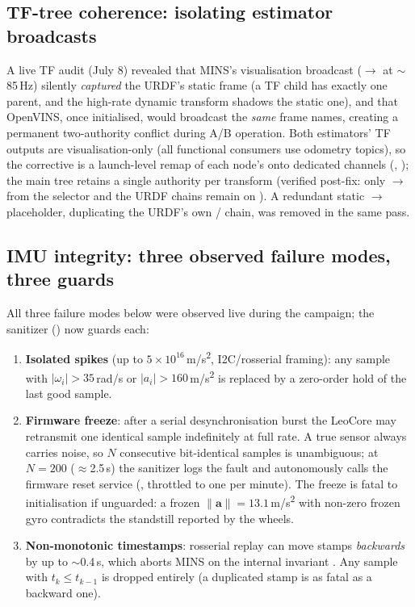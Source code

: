 \subsection{TF-tree coherence: isolating estimator broadcasts}
A live TF audit (July 8) revealed that MINS's visualisation broadcast
($\to$ at $\sim$85\,Hz) silently \emph{captured} the
URDF's static  frame (a TF child has exactly one parent, and the
high-rate dynamic transform shadows the static one), and that OpenVINS,
once initialised, would broadcast the \emph{same} frame names, creating a
permanent two-authority conflict during A/B operation. Both estimators' TF
outputs are visualisation-only (all functional consumers use odometry
topics), so the corrective is a launch-level remap of each node's 
onto dedicated channels (, ); the main tree
retains a single authority per transform (verified post-fix: only
$\to$ from the selector and the URDF chains
remain on ). A redundant static $\to$
placeholder, duplicating the URDF's own
/ chain, was removed in the same pass.

\subsection{IMU integrity: three observed failure modes, three guards}
\label{sec:guards}
All three failure modes below were observed live during the campaign; the
sanitizer () now guards each:

\begin{enumerate}
  \item \textbf{Isolated spikes} (up to $5\times10^{16}$\,m/s\textsuperscript{2},
        I2C/rosserial framing): any sample with
        $|\omega_i|>35$\,rad/s or $|a_i|>160$\,m/s\textsuperscript{2}
        is replaced by a zero-order hold of the last good sample.
  \item \textbf{Firmware freeze}: after a serial desynchronisation burst the
        LeoCore may retransmit one identical sample indefinitely at full rate.
        A true sensor always carries noise, so $N$ consecutive bit-identical
        samples is unambiguous; at $N{=}200$ ($\approx$2.5\,s) the sanitizer
        logs the fault and autonomously calls the firmware reset service
        (, throttled to one per minute). The
        freeze is fatal to initialisation if unguarded: a frozen
        $\lVert\mathbf{a}\rVert = 13.1$\,m/s\textsuperscript{2} with
        non-zero frozen gyro contradicts the standstill reported by the
        wheels.
  \item \textbf{Non-monotonic timestamps}: rosserial replay can move stamps
        \emph{backwards} by up to $\sim$0.4\,s, which aborts MINS on the
        internal invariant . Any sample with
        $t_k \le t_{k-1}$ is dropped entirely (a duplicated stamp is as fatal
        as a backward one).
\end{enumerate}

